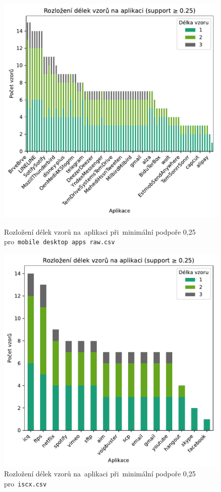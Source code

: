 \begin{figure}[H]
	\centering
	\begin{minipage}[t]{0.5\textwidth}
		\centering
		\includegraphics[width=\linewidth]{obrazky-figures/exps/pattern_lengths_0.25_mobile.pdf}
		\caption{Rozložení délek vzorů na~aplikaci při~minimální podpoře 0{,}25 pro~\texttt{mobile desktop apps raw.csv}}
		\label{fig:ex2-mobile-patterns-len-025}
	\end{minipage}
	\hfill
	\begin{minipage}[t]{0.49\textwidth}
		\centering
		\includegraphics[width=\linewidth]{obrazky-figures/exps/pattern_lengths_0.25_iscx.pdf}
		\caption{Rozložení délek vzorů na~aplikaci při~minimální podpoře 0{,}25 pro~\texttt{iscx.csv}}
		\label{fig:ex2-iscx-patterns-len-025}
	\end{minipage}
\end{figure}

